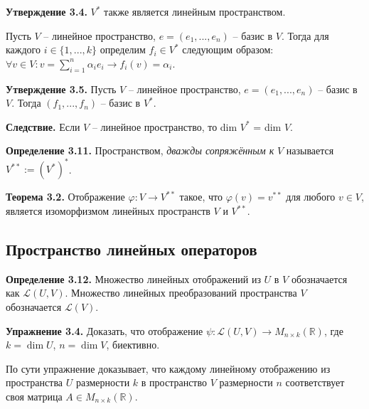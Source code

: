 \documentclass[a4paper, 12pt]{article}
\begin{document}
\begin{spacing}{1.5}
\textbf{Утверждение 3.4.} $V^*$ также является линейным пространством.

Пусть $V$ -- линейное пространство, $e = (e_1, ..., e_n)$ -- базис в $V$. Тогда для каждого $i \in \{1, ..., k \}$ определим $f_i \in V^*$ следующим образом: $\forall v \in V: v = \sum_{i=1}^n \alpha_i e_i \rightarrow f_i(v) = \alpha_i$.

\textbf{Утверждение 3.5.} Пусть $V$ -- линейное пространство, $e = (e_1, ..., e_n)$ -- базис в $V$. Тогда $(f_1, ..., f_n)$ -- базис в $V^*$.

\textbf{Следствие.} Если $V$ -- линейное пространство, то dim $V^*$ = dim $V$. 

\textbf{Определение 3.11.} Пространством, \textit{дважды сопряжённым к} $V$ называется $V^{**} := (V^*)^*$. 

\textbf{Теорема 3.2.} Отображение $\varphi: V \rightarrow V^{**}$ такое, что $\varphi(v) = v^{**}$ для любого $v \in V$, является изоморфизмом линейных пространств $V$ и $V^{**}$.


\subsection*{Пространство линейных операторов}

\textbf{Определение 3.12.} Множество линейных отображений из $U$ в $V$ обозначается как $\mathcal{L} (U, V)$. Множество линейных преобразований пространства $V$ обозначается $\mathcal{L} (V)$.

\textbf{Упражнение 3.4.} Доказать, что  отображение $\psi: \mathcal{L} (U, V) \rightarrow M_{n \times k}(\mathbb{R})$, где $k = \dim U$, $n = \dim V$, биективно. 

По сути упражнение доказывает, что каждому линейному отображению из пространства $U$ размерности $k$ в пространство $V$ размерности $n$ соответствует своя матрица $A \in M_{n \times k}(\mathbb{R})$.

\end{spacing}
\end{document}
